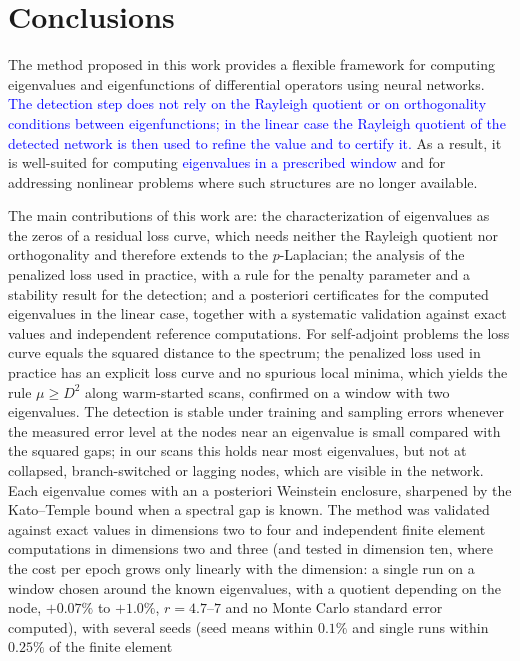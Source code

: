 \documentclass[10pt]{amsart}
\newcommand{\rev}[1]{\textcolor{blue}{#1}}
\newenvironment{revblock}{\color{blue}}{}
\theoremstyle{definition}
\theoremstyle{remark}
\theoremstyle{plain}
\begin{document}
\section{Conclusions}\label{sec.conclusions}

The method proposed in this work provides a flexible framework for computing eigenvalues and eigenfunctions of differential operators using neural networks. \rev{The detection step does not rely on the Rayleigh quotient or on orthogonality conditions between eigenfunctions; in the linear case the Rayleigh quotient of the detected network is then used to refine the value and to certify it.} As a result, it is well-suited for computing \rev{eigenvalues in a prescribed window} and for addressing nonlinear problems where such structures are no longer available.

\begin{revblock}
The main contributions of this work are: the characterization of eigenvalues as the zeros of a
residual loss curve, which needs neither the Rayleigh quotient nor orthogonality and therefore extends
to the $p$-Laplacian; the analysis of the penalized loss used in practice, with a rule for the penalty
parameter and a stability result for the detection; and a posteriori certificates for the computed
eigenvalues in the linear case, together with a systematic validation against exact values and
independent reference computations.
For self-adjoint problems the loss curve equals the squared distance to the spectrum; the penalized
loss used in practice has an explicit loss curve and no spurious local minima, which yields the rule
$\mu\ge D^2$ along warm-started scans, confirmed on a window with two eigenvalues. The detection is
stable under training and sampling errors whenever the measured error level at the nodes near an
eigenvalue is small compared with the squared gaps; in our scans this holds near most eigenvalues,
but not at collapsed, branch-switched or lagging nodes, which are visible in the network. Each
eigenvalue comes with an a posteriori Weinstein enclosure, sharpened by the Kato--Temple bound when a
spectral gap is known. The method was
validated against exact values in dimensions two to four and independent finite element computations in
dimensions two and three
(and tested in dimension ten, where the cost per epoch grows only linearly with the dimension: a
single run on a window chosen around the known eigenvalues, with a quotient depending on the node,
$+0.07\%$ to $+1.0\%$, $r=4.7$--$7$ and no Monte Carlo standard error computed),
with several seeds (seed means within $0.1\%$ and single runs within $0.25\%$ of the finite element

\end{revblock}
\end{document}
